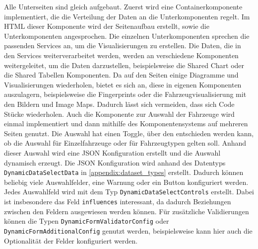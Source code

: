 Alle Unterseiten sind gleich aufgebaut. Zuerst wird eine Containerkomponente implementiert, die die Verteilung der Daten an die Unterkomponenten regelt. Im HTML dieser Komponente wird der Seitenaufbau erstellt, sowie die Unterkomponenten angesprochen. Die einzelnen Unterkomponenten sprechen die passenden Services an, um die Visualisierungen zu erstellen. Die Daten, die in den Services weiterverarbeitet werden, werden an verschiedene Komponenten weitergeleitet, um die Daten darzustellen, beispielsweise die Shared Chart oder die Shared Tabellen Komponenten. Da auf den Seiten einige Diagramme und Visualisierungen wiederholen, bietet es sich an, diese in eigenen Komponenten auszulagern, beispielsweise die Fingerprints oder die Fahrzeugvisualisierung mit den Bildern und Image Maps. Dadurch lässt sich vermeiden, dass sich Code Stücke wiederholen. Auch die Komponente zur Auswahl der Fahrzeuge wird einmal implementiert und dann mithilfe des Komponentensystems auf mehreren Seiten genutzt. Die Auswahl hat einen Toggle, über den entschieden werden kann, ob die Auswahl für Einzelfahrzeuge oder für Fahrzeugtypen gelten soll. Anhand dieser Auswahl wird eine JSON Konfiguration erstellt und die Auswahl dynamisch erzeugt. Die JSON Konfiguration wird anhand des Datentyps \texttt{DynamicDataSelectData} in \ref{appendix:dataset_types} erstellt. Dadurch können beliebig viele Auswahlfelder, eine Warnung oder ein Button konfiguriert werden. Jedes Auswahlfeld wird mit dem Typ \texttt{DynamicDataSelectControls} erstellt. Dabei ist insbesondere das Feld \texttt{influences} interessant, da dadurch Beziehungen zwischen den Feldern ausgewiesen werden können. Für zusätzliche Validierungen können die Typen \texttt{DynamicFormValidatorConfig} oder \texttt{DynamicFormAdditionalConfig} genutzt werden, beispielsweise kann hier auch die Optionalität der Felder konfiguriert werden.
